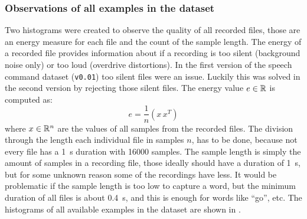 
\subsubsection{Observations of all examples in the dataset}
Two histograms were created to observe the quality of all recorded files, those are an energy measure for each file and the count of the sample length.
The energy of a recorded file provides information about if a recording is too silent (background noise only) or too loud (overdrive distortions). In the first version of the speech command dataset (\texttt{v0.01}) too silent files were an issue.
Luckily this was solved in the second version by rejecting those silent files.
The energy value $e \in \mathbb{R}$ is computed as:
\begin{equation}\label{eq:exp_dataset_energy}
  e = \frac{1}{n} \left( x\, x^T \right)
\end{equation}
where $x \in \mathbb{R}^n$ are the values of all samples from the recorded files.
The division through the length each individual file in samples $n$, has to be done, because not every file has a \SI{1}{\second} duration with 16000 samples.
The sample length is simply the amount of samples in a recording file, those ideally should have a duration of \SI{1}{\second}, but for some unknown reason some of the recordings have less.
It would be problematic if the sample length is too low to capture a word, but the minimum duration of all files is about \SI{0.4}{\second}, and this is enough for words like \enquote{go}, etc.
The histograms of all available examples in the dataset are shown in .


